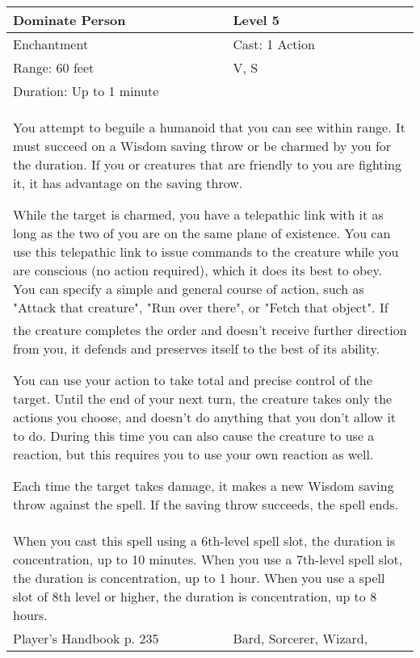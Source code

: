 \documentclass[11pt]{report}
\begin{document}
\begin{table}[H]
	\begin{tabular}{||p{6cm}|p{6cm}||}
		\hline\hline
		\bf{Dominate Person} & Level 5\\ \hline
		Enchantment & Cast: 1 Action\\ \hline
		Range: 60 feet & V, S\\ \hline
		Duration: Up to 1 minute & \\ \hline
		\multicolumn{2}{||p{12cm}||}{You attempt to beguile a humanoid that you can see within range. 
It must succeed on a Wisdom saving throw or be charmed by you for the duration. If you or creatures that are friendly to you are fighting it, it has advantage on the saving throw. 

While the target is charmed, you have a telepathic link with it as long as the two of you are on the same plane of existence. You can use this telepathic link to issue commands to the creature while you are conscious (no action required), which it does its best to obey. You can specify a simple and general course of action, such as "Attack that creature", "Run over there", or "Fetch that object". If the creature completes the order and doesn’t receive further direction from you, it defends and preserves itself to the best of its ability. 

You can use your action to take total and precise control of the target. Until the end of your next turn, the creature takes only the actions you choose, and doesn’t do anything that you don’t allow it to do. During this time you can also cause the creature to use a reaction, but this requires you to use your own reaction as well. 

Each time the target takes damage, it makes a new Wisdom saving throw against the spell. If the saving throw succeeds, the spell ends.}\\ \hline
		\multicolumn{2}{||p{12cm}||}{When you cast this spell using a 6th-level spell slot, the duration is concentration, up to 10 minutes. 
When you use a 7th-level spell slot, the duration is concentration, up to 1 hour. 
When you use a spell slot of 8th level or higher, the duration is concentration, up to 8 hours.}\\ \hline
Player's Handbook p. 235 & Bard, Sorcerer, Wizard, \\ \hline\hline
	\end{tabular}
\end{table}
\end{document}
